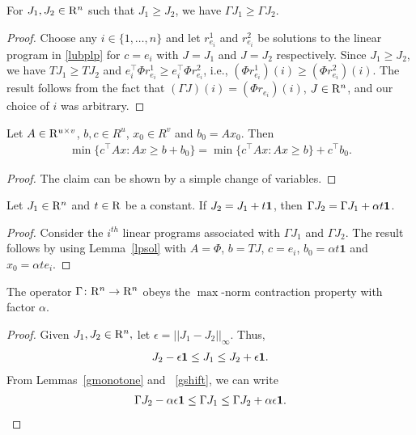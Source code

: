 \begin{lemma}\label{gmonotone}
For $J_1, J_2\in \mathrm{R}^n$ such that $J_1\geq J_2$, we have $\Gamma J_1\geq \Gamma J_2$.
\end{lemma}
\begin{proof}
Choose any $i\in \{1,\ldots,n\}$ and let $r^1_{e_i}$ and $r^2_{e_i}$ be solutions to the linear program in \eqref{lubplp} for $c=e_i$ with $J=J_1$ and $J=J_2$ respectively. Since $J_1\geq J_2$, we have $TJ_1\geq TJ_2$ and $e_i^\top \Phi r^1_{e_i} \geq e_i^\top \Phi r^2_{e_i}$, i.e., $(\Phi r^1_{e_i})(i)\geq (\Phi r^2_{e_i})(i)$. The result follows from the fact that $(\Gamma J)(i)=(\Phi r_{e_i})(i)$, $J\in \mathrm{R}^n$, and our choice of $i$ was arbitrary.
\end{proof}
\begin{lemma}\label{lpsol}
Let $A\in \mathrm{R}^{u\times v}$, $b,c\in R^u$, $x_0 \in R^v$ and $b_0=Ax_0$. Then
\begin{align}
\min\{c^\top Ax:Ax\geq b+b_0\} =\min\{c^\top Ax:Ax\geq b\}+c^\top b_0.
\end{align}
\end{lemma}
\begin{proof}
The claim can be shown by a simple change of variables.
\end{proof}
\begin{lemma}\label{gshift}
Let $J_1\in \mathrm{R}^n$ and $t\in \mathrm{R}$ be a constant. If $J_2=J_1+t\mathbf{1}$, then $\Gamma J_2=\Gamma J_1+\alpha t\mathbf{1}$.
\end{lemma}
\begin{proof}
Consider the $i^{th}$ linear programs associated with $\Gamma J_1$ and $\Gamma J_2$. The result follows by using Lemma~\ref{lpsol} with $A=\Phi$, $b=TJ$, $c=e_i$, $b_0=\alpha t\mathbf{1}$ and $x_0=\alpha t e_i$.
\end{proof}
\begin{theorem}\label{gmaxcontra}
The operator $\Gamma  \colon \mathrm{R}^n\rightarrow \mathrm{R}^n$ obeys the $\max$-norm contraction property with factor $\alpha$.
\end{theorem}
\begin{proof}
Given $J_1,J_2\in \mathrm{R}^n,$ let $\epsilon=||J_1-J_2||_\infty$. Thus,
\begin{align}\label{ineq}
J_2-\epsilon\one\leq J_1\leq J_2+\epsilon \one.
\end{align}
From Lemmas~\ref{gmonotone} and ~\ref{gshift}, we can write
\begin{align}\label{ineq}
\Gamma J_2-\alpha \epsilon\one\leq \Gamma J_1\leq \Gamma J_2+\alpha \epsilon\one.
\end{align}
\end{proof}
